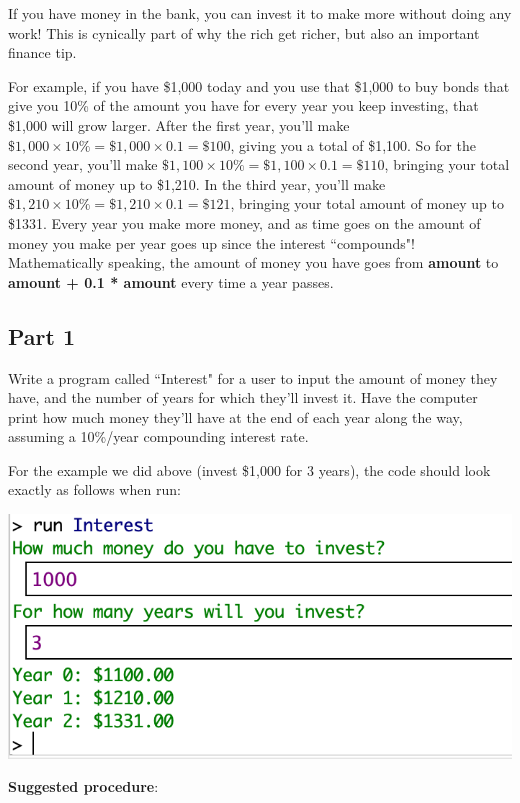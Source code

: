 \documentclass[answers,addpoints]{exam} %
\begin{document}
\begin{questions}
\pagebreak 

\question[15] 

If you have money in the bank, you can invest it to make more without doing any work! This is cynically part of why the rich get richer, but also an important finance tip. 

For example, if you have \$1,000 today and you use that \$1,000 to buy bonds that give you 10\% of the amount you have for every year you keep investing, that \$1,000 will grow larger. After the first year, you'll make $\$1,000 \times 10\%=\$1,000 \times 0.1=\$100$, giving you a total of \$1,100. So for the second year, you'll make $\$1,100 \times 10\% = \$1,100 \times 0.1 = \$110$, bringing your total amount of money up to \$1,210. In the third year, you'll make $\$1,210 \times 10\% = \$1,210 \times 0.1 = \$121$, bringing your total amount of money up to \$1331. Every year you make more money, and as time goes on the amount of money you make per year goes up since the interest ``compounds"! Mathematically speaking, the amount of money you have goes from \textbf{amount} to \textbf{amount + 0.1 * amount} every time a year passes. 

\subsection{Part 1}
Write a program called ``Interest" for a user to input the amount of money they have, and the number of years for which they'll invest it. Have the computer print how much money they'll have at the end of each year along the way, assuming a 10\%/year compounding interest rate. 

For the example we did above (invest \$1,000 for 3 years), the code should look exactly as follows when run: 

\includegraphics{interestExample}

\textbf{Suggested procedure}:


\end{questions}
\end{document}
